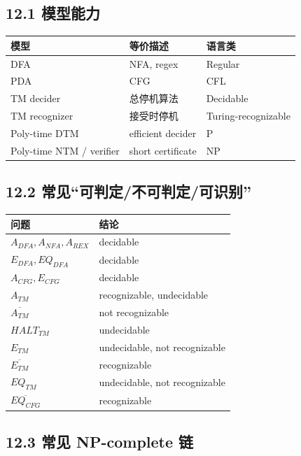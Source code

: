 ﻿\documentclass[UTF8,11pt]{ctexart}
\begin{document}
\subsection{12.1 模型能力}


\begin{longtable}{|p{}|p{}|p{}|}
\hline
\textbf{模型} & \textbf{等价描述} & \textbf{语言类} \\
\hline
DFA & NFA, regex & Regular \\
\hline
PDA & CFG & CFL \\
\hline
TM decider & 总停机算法 & Decidable \\
\hline
TM recognizer & 接受时停机 & Turing-recognizable \\
\hline
Poly-time DTM & efficient decider & P \\
\hline
Poly-time NTM / verifier & short certificate & NP \\
\hline
\end{longtable}


\subsection{12.2 常见“可判定/不可判定/可识别”}


\begin{longtable}{|p{}|p{}|}
\hline
\textbf{问题} & \textbf{结论} \\
\hline
\(A_{DFA},A_{NFA},A_{REX}\) & decidable \\
\hline
\(E_{DFA},EQ_{DFA}\) & decidable \\
\hline
\(A_{CFG},E_{CFG}\) & decidable \\
\hline
\(A_{TM}\) & recognizable, undecidable \\
\hline
\(\overline{A_{TM}}\) & not recognizable \\
\hline
\(HALT_{TM}\) & undecidable \\
\hline
\(E_{TM}\) & undecidable, not recognizable \\
\hline
\(\overline{E_{TM}}\) & recognizable \\
\hline
\(EQ_{TM}\) & undecidable, not recognizable \\
\hline
\(\overline{EQ_{CFG}}\) & recognizable \\
\hline
\end{longtable}


\subsection{12.3 常见 NP-complete 链}
\end{document}
